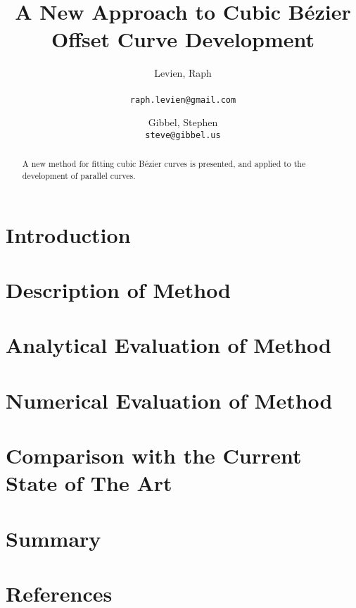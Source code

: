 \documentclass{article}
\title{A New Approach to Cubic B\'ezier Offset Curve Development}
\author{
	Levien, Raph \\
	\todo{add title \& affiliation} \\
	\texttt{raph.levien@gmail.com} \\
	\and
	Gibbel, Stephen \\
	\texttt{steve@gibbel.us}
}
\begin{document}
\maketitle
\begin{abstract}
	A new method for fitting cubic B\'ezier curves is presented, and applied to the development of parallel curves.
\end{abstract}

\section{Introduction}

\section{Description of Method}

\section{Analytical Evaluation of Method}

\section{Numerical Evaluation of Method}

\section{Comparison with the Current State of The Art}

\section{Summary}

\section{References}
\printbibliography
\end{document}

